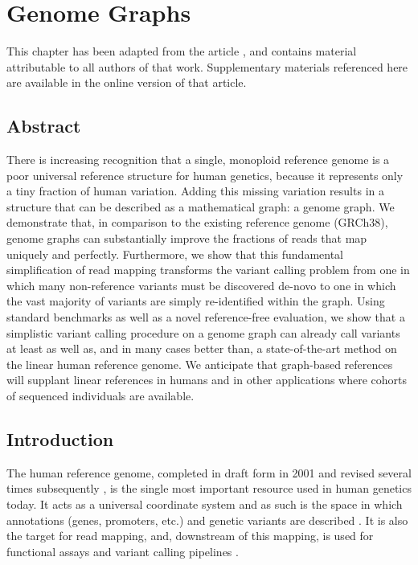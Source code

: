 
\chapter{Genome Graphs}
\label{ch:bakeoff}

This chapter has been adapted from the article \citet{novak2017genome}, and contains material attributable to all authors of that work. Supplementary materials referenced here are available in the online version of that article.

\section{Abstract}

There is increasing recognition that a single, monoploid reference
genome is a poor universal reference structure for human genetics,
because it represents only a tiny fraction of human variation. Adding
this missing variation results in a structure that can be described as a
mathematical graph: a genome graph. We demonstrate that, in comparison
to the existing reference genome (GRCh38), genome graphs can
substantially improve the fractions of reads that map uniquely and
perfectly. Furthermore, we show that this fundamental simplification of
read mapping transforms the variant calling problem from one in which
many non-reference variants must be discovered de-novo to one in which
the vast majority of variants are simply re-identified within the graph.
Using standard benchmarks as well as a novel reference-free evaluation,
we show that a simplistic variant calling procedure on a genome graph
can already call variants at least as well as, and in many cases better
than, a state-of-the-art method on the linear human reference genome. We
anticipate that graph-based references will supplant linear references
in humans and in other applications where cohorts of sequenced
individuals are available.

\section{Introduction}

The human reference genome, completed in draft form in 2001 and revised
several times subsequently \cite{Lander2001-gm,church2011modernizing}, is the
single most important resource used in human genetics today. It acts as
a universal coordinate system and as such is the space in which
annotations (genes, promoters, etc.) and genetic variants are described
\cite{Harrow2012-ei,ENCODE_Project_Consortium2012-rx,10002015global}.
It is also the target for read mapping, and, downstream of this mapping,
is used for functional assays and variant calling pipelines
\cite{li2009fast,depristo2011framework}.

